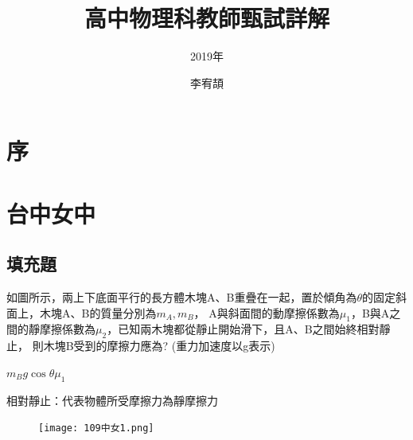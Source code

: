 \documentclass[cn,10pt,math=newtx]{elegantbook}
\title{高中物理科教師甄試詳解}
\subtitle{2019年}
\author{李宥頡}
\institute{National Taiwan University}
\begin{document}
\maketitle
\frontmatter

\chapter*{序}



\tableofcontents

\mainmatter

\chapter{台中女中}


\section{填充題}

\begin{example}
  如圖所示，兩上下底面平行的長方體木塊A、B重疊在一起，置於傾角為$\theta$的固定斜面上，木塊A、B的質量分別為$m_A, m_B$，
  A與斜面間的動摩擦係數為$\mu_1$，B與A之間的靜摩擦係數為$\mu_2$，已知兩木塊都從靜止開始滑下，且A、B之間始終相對靜止，
  則木塊B受到的摩擦力應為? (重力加速度以g表示)\\
  \rightline{[台中女中教甄109]}
\end{example}
\begin{solution}
$m_{B}g\cos \theta \mu_1$
\end{solution}
\begin{note}
  相對靜止：代表物體所受摩擦力為靜摩擦力
\end{note}
\begin{figure}[htbp]
  \flushright
  \texttt{[image: 109中女1.png]}
\end{figure}
\newpage
\end{document}
